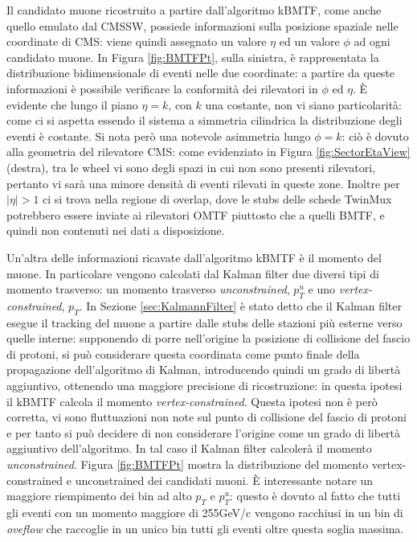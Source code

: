 Il candidato muone ricostruito a partire dall'algoritmo kBMTF, come anche quello emulato dal CMSSW, possiede informazioni sulla posizione spaziale nelle coordinate di CMS: viene quindi assegnato un valore $\eta$ ed un valore $\phi$ ad ogni candidato muone. In Figura \ref{fig:BMTFPt}, sulla sinistra, è rappresentata la distribuzione bidimensionale di eventi nelle due coordinate: a partire da queste informazioni è possibile verificare la conformità dei rilevatori in $\phi$ ed $\eta$. È evidente che lungo il piano $\eta = k$, con $k$ una costante, non vi siano particolarità: come ci si aspetta essendo il sistema a simmetria cilindrica la distribuzione degli eventi è costante. Si nota però una notevole asimmetria lungo $\phi = k$: ciò è dovuto alla geometria del rilevatore CMS: come evidenziato in Figura \ref{fig:SectorEtaView} (destra), tra le wheel vi sono degli spazi in cui non sono presenti rilevatori, pertanto vi sarà una minore densità di eventi rilevati in queste zone. Inoltre per $|\eta| > 1$ ci si trova nella regione di overlap, dove le stubs delle schede TwinMux potrebbero essere inviate ai rilevatori OMTF piuttosto che a quelli BMTF, e quindi non contenuti nei dati a disposizione.

Un'altra delle informazioni ricavate dall'algoritmo kBMTF è il momento del muone. In particolare vengono calcolati dal Kalman filter due diversi tipi di momento trasverso: un momento trasverso \textit{unconstrained}, $p_T^u$ e uno \textit{vertex-constrained}, $p_T$. In Sezione \ref{sec:KalmannFilter} è stato detto che il Kalman filter esegue il tracking del muone a partire dalle stubs delle stazioni più esterne verso quelle interne: supponendo di porre nell'origine la posizione di collisione del fascio di protoni, si può considerare questa coordinata come punto finale della propagazione dell'algoritmo di Kalman, introducendo quindi un grado di libertà aggiuntivo, ottenendo una maggiore precisione di ricostruzione: in questa ipotesi il kBMTF calcola il momento \textit{vertex-constrained}. \newline
Questa ipotesi non è però corretta, vi sono fluttuazioni non note sul punto di collisione del fascio di protoni e per tanto si può decidere di non considerare l'origine come un grado di libertà aggiuntivo dell'algoritmo. In tal caso il Kalman filter calcolerà il momento \textit{unconstrained}. 
Figura \ref{fig:BMTFPt} mostra la distribuzione del momento vertex-constrained e unconstrained dei candidati muoni. È interessante notare un maggiore riempimento dei bin ad alto $p_T$ e $p_T^u$: questo è dovuto al fatto che tutti gli eventi con un momento maggiore di 255GeV/c vengono racchiusi in un bin di \textit{oveflow} che raccoglie in un unico bin tutti gli eventi oltre questa soglia massima.


